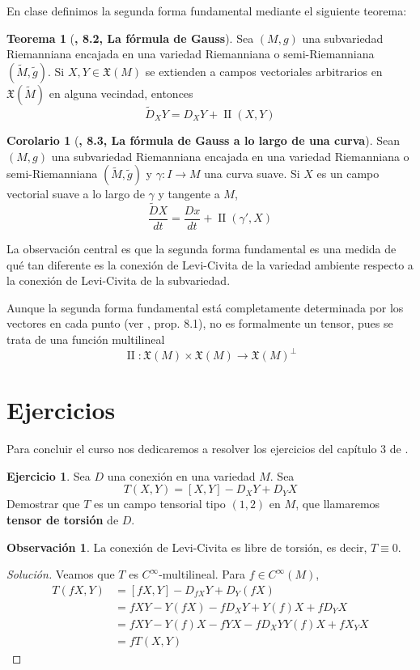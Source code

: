 \documentclass[spanish]{book}
\theoremstyle{definition}
\newtheorem*{teo}{Teorema}
\newtheorem*{coro}{Corolario}
\newtheorem*{obs}{Observación}
\newtheorem{ejer}{Ejercicio}
\newcommand{\X}{\mathfrak{X}}
\newcommand{\Cinf}{C^\infty}
\begin{document}
En clase definimos la segunda forma fundamental mediante el siguiente teorema:

\begin{teo}[\cite{Lee-riem}\textbf{, 8.2, La fórmula de Gauss}]
	Sea $(M,g)$ una subvariedad Riemanniana encajada en una variedad Riemanniana o semi-Riemanniana $(\tilde{M},\tilde{g})$. Si $X,Y\in\X(M)$ se extienden a campos vectoriales arbitrarios en $\X(\tilde{M})$ en alguna vecindad, entonces
	\[\tilde{D}_XY=D_XY+\operatorname{II}(X,Y)\]
\end{teo}
\begin{coro}[\cite{Lee-riem}\textbf{, 8.3, La fórmula de Gauss a lo largo de una curva}]
	Sean $(M,g)$ una subvariedad Riemanniana encajada en una variedad Riemanniana o semi-Riemanniana $(\tilde{M},\tilde{g})$ y $\gamma:I\to M$ una curva suave. Si $X$ es un campo vectorial suave a lo largo de $\gamma$ y tangente a $M$,
	\[\frac{\tilde{D}X}{dt}=\frac{Dx}{dt}+\operatorname{II}(\gamma',X)\]
\end{coro}

La observación central es que la segunda forma fundamental es una medida de qué tan diferente es la conexión de Levi-Civita de la variedad ambiente respecto a la conexión de Levi-Civita de la subvariedad.

Aunque la segunda forma fundamental está completamente determinada por los vectores en cada punto (ver \cite{Lee-riem}, prop. 8.1), no es formalmente un tensor, pues se trata de una función multilineal
\[\operatorname{II}:\X(M)\times\X(M)\to\X(M)^\perp\]


\iffalse
\section{Ejercicios}
Para concluir el curso nos dedicaremos a resolver los ejercicios del capítulo 3 de \cite{ONeill}.

\begin{ejer}
	Sea $D$ una conexión en una variedad $M$. Sea
	\[T(X,Y)=[X,Y]-D_XY+D_YX\]
	Demostrar que $T$ es un campo tensorial tipo $(1,2)$ en $M$, que llamaremos \textbf{tensor de torsión} de $D$.
\end{ejer}
\begin{obs}
	La conexión de Levi-Civita es libre de torsión, es decir, $T\equiv0$.
\end{obs}
\begin{proof}[Solución]
	Veamos que $T$ es $\Cinf$-multilineal. Para $f\in\Cinf(M)$,
	\begin{align*}
		T(fX,Y)&=[fX,Y]-D_{fX}Y+D_Y(fX)\\
		&=fXY-Y(fX)-fD_XY+Y(f)X+fD_YX\\
		&=fXY-Y(f)X-fYX-fD_XYY(f)X+fX_YX\\
		&=fT(X,Y)
	\end{align*}
\end{proof}
\end{document}
